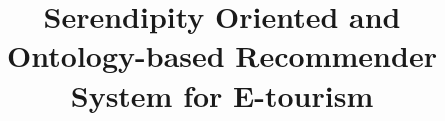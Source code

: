 \documentclass[sigconf]{acmart}
\begin{document}
\title{Serendipity Oriented and Ontology-based Recommender System for E-tourism}
 





\end{document}
